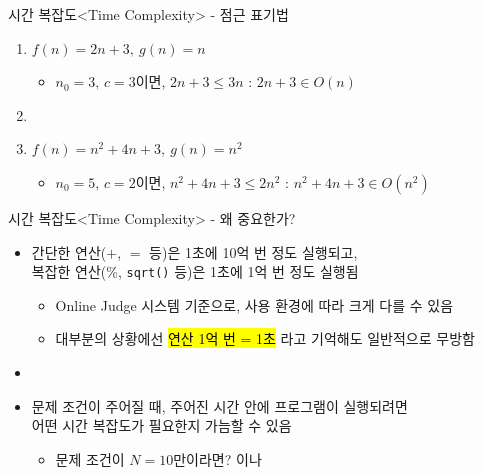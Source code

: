 \begin{frame}{시간 복잡도}{<Time Complexity> - 점근 표기법}
  \begin{enumerate}
    \item $f(n) = 2n+3,\ g(n) = n$
    \begin{itemize}
      \item $n_0 = 3,\, c = 3$이면, $2n+3 \le 3n$ : $2n+3 \in O(n)$
    \end{itemize}
    \item[] \vspace{2mm}
    \item $f(n) = n^2+4n+3,\ g(n) = n^2$
    \begin{itemize}
      \item $n_0 = 5,\, c = 2$이면, $n^2+4n+3 \le 2n^2$ : $n^2+4n+3 \in O(n^2)$
    \end{itemize}
  \end{enumerate}
  \vspace{9mm}
\end{frame}

\begin{frame}{시간 복잡도}{<Time Complexity> - 왜 중요한가?}
  \begin{itemize}
    \item 간단한 연산($+$, $=$ 등)은 1초에 10억 번 정도 실행되고,\\
      복잡한 연산(\%, \texttt{sqrt()} 등)은 1초에 1억 번 정도 실행됨
    \begin{itemize}
      \item Online Judge 시스템 기준으로, 사용 환경에 따라 크게 다를 수 있음
      \item 대부분의 상황에선 \hl{연산 1억 번 = 1초} 라고 기억해도 일반적으로 무방함
    \end{itemize}
    \item[] \vspace{3mm}
    \item 문제 조건이 주어질 때, 주어진 시간 안에 프로그램이 실행되려면\\
      어떤 시간 복잡도가 필요한지 가늠할 수 있음
    \begin{itemize}
      \item 문제 조건이 $N=10$만이라면? 이나 
    \end{itemize}
  \end{itemize}
\end{frame}

